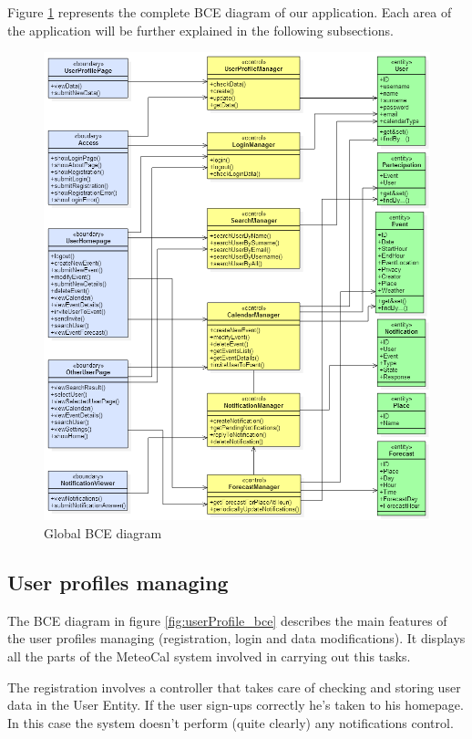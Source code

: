 \documentclass[10pt,a4paper,titlepage]{article}
\begin{document}
Figure \ref{fig:global_bce} represents the complete BCE diagram of our application. Each area of the application will be further explained in the following subsections.
\begin{figure}[p]
\centering
\includegraphics[width=\linewidth]{./bce/global_bce}
\caption[global bce]{Global BCE diagram}
\label{fig:global_bce}
\end{figure}
\clearpage

\subsection{User profiles managing}
The BCE diagram in figure \ref{fig:userProfile_bce} describes the main features of the user profiles managing (registration, login and data modifications). It displays all the parts of the MeteoCal system involved in carrying out this tasks.

The registration involves a controller that takes care of checking and storing user data in the User Entity. If the user sign-ups correctly he's taken to his homepage.  In this case the system doesn't perform  (quite clearly) any notifications control.
\end{document}
